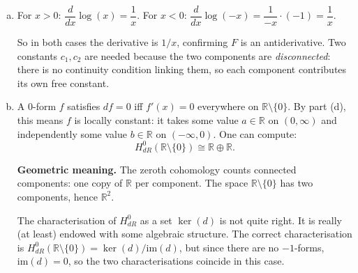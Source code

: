 \documentclass[12pt]{article}
\begin{document}
\begin{enumerate}[(a)]
    Away from $0$, exactly one of the two indicators equals $1$ and the other $0$, so their sum is $1$ on $\mathbb{R} \setminus \{0\}$. The two indicators ``see'' opposite components; together they record which component a point belongs to.

    \item For $x > 0$: $\dfrac{d}{dx}\log(x) = \dfrac{1}{x}$. \quad For $x < 0$: $\dfrac{d}{dx}\log(-x) = \dfrac{1}{-x}\cdot(-1) = \dfrac{1}{x}$.

    So in both cases the derivative is $1/x$, confirming $F$ is an antiderivative. Two constants $c_1, c_2$ are needed because the two components are \emph{disconnected}: there is no continuity condition linking them, so each component contributes its own free constant.

    \item A $0$-form $f$ satisfies $df = 0$ iff $f'(x) = 0$ everywhere on $\mathbb{R}\setminus\{0\}$. By part (d), this means $f$ is locally constant: it takes some value $a \in \mathbb{R}$ on $(0,\infty)$ and independently some value $b \in \mathbb{R}$ on $(-\infty,0)$. One can compute:
    \[
        H^0_{dR}(\mathbb{R} \setminus \{0\}) \cong \mathbb{R} \oplus \mathbb{R}.
    \]

    \textbf{Geometric meaning.} The zeroth cohomology counts connected components: one copy of $\mathbb{R}$ per component. The space $\mathbb{R} \setminus \{0\}$ has two components, hence $\mathbb{R}^2$.

   The characterisation of $H^0_{dR}$ as a set $\ker(d)$ is not quite right. It is really (at least) endowed with some algebraic structure. The correct characterisation is $H^0_{dR}(\mathbb{R} \setminus \{0\}) = \ker(d) / \mathrm{im}(d)$, but since there are no $-1$-forms, $\mathrm{im}(d) = 0$, so the two characterisations coincide in this case.
\end{enumerate}
\end{document}
